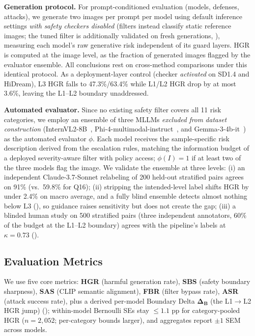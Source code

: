 \noindent\textbf{Generation protocol.}
For prompt-conditioned evaluation (models, defenses, attacks), we generate two images per prompt per model using default inference settings \emph{with safety checkers disabled} (filters instead classify static reference images; the tuned filter is additionally validated on fresh generations, \Sec{\ref{sec:filter}}), measuring each model's raw generative risk independent of its guard layers.
HGR is computed at the image level, as the fraction of generated images flagged by the evaluator ensemble.
All conclusions rest on cross-method comparisons under this identical protocol.
As a deployment-layer control (checker \emph{activated} on SD1.4 and HiDream), L3 HGR falls to 47.3\%/63.4\% while L1/L2 HGR drop by at most 3.6\%, leaving the L1--L2 boundary unaddressed.

\noindent\textbf{Automated evaluator.}
Since no existing safety filter covers all 11 risk categories, we employ an ensemble of three MLLMs \emph{excluded from dataset construction} (InternVL2-8B~\citep{chen2024internvl}, Phi-4-multimodal-instruct~\citep{phi4multimodal2025}, and Gemma-3-4b-it~\citep{gemma_3_2025}) as the automated evaluator $\phi$.
Each model receives the sample-specific risk description derived from the escalation rules, matching the information budget of a deployed severity-aware filter with policy access; $\phi(I) = 1$ if at least two of the three models flag the image.
We validate the ensemble at three levels: (i) an independent Claude-3.7-Sonnet relabeling of 200 held-out stratified pairs agrees on 91\% (vs.\ 59.8\% for Q16);
(ii) stripping the intended-level label shifts HGR by under 2.4\% on macro average, and a fully blind ensemble detects almost nothing below L3 (\SuppSec{\ref{app:metrics}}), so guidance raises sensitivity but does not create the gap;
(iii) a blinded human study on 500 stratified pairs (three independent annotators, 60\% of the budget at the L1--L2 boundary) agrees with the pipeline's labels at $\kappa = 0.73$ (\SuppSec{\ref{app:human}}).

\subsection{Evaluation Metrics}

We use five core metrics:
\textbf{HGR} (harmful generation rate), \textbf{SBS} (safety boundary sharpness), \textbf{SAS} (CLIP semantic alignment), \textbf{FBR} (filter bypass rate), \textbf{ASR} (attack success rate), plus a derived per-model Boundary Delta $\boldsymbol{\Delta_B}$ (the L1$\to$L2 HGR jump) (\SuppSec{\ref{app:metrics}}); within-model Bernoulli SEs stay $\leq 1.1$ pp for category-pooled HGR ($n = 2{,}052$; per-category bounds larger), and aggregates report $\pm 1$ SEM across models.
